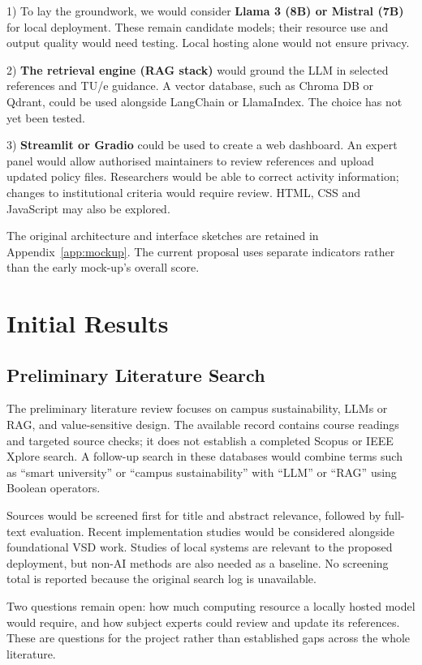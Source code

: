 \documentclass[11pt,a4paper]{article}
\begin{document}
1) To lay the groundwork, we would consider \textbf{Llama 3 (8B) or Mistral (7B)} for local deployment. These remain candidate models; their resource use and output quality would need testing. Local hosting alone would not ensure privacy.

2) \textbf{The retrieval engine (RAG stack)} would ground the LLM in selected references and TU/e guidance. A vector database, such as Chroma DB or Qdrant, could be used alongside LangChain or LlamaIndex. The choice has not yet been tested.

3) \textbf{Streamlit or Gradio} could be used to create a web dashboard. An expert panel would allow authorised maintainers to review references and upload updated policy files. Researchers would be able to correct activity information; changes to institutional criteria would require review. HTML, CSS and JavaScript may also be explored.

The original architecture and interface sketches are retained in Appendix~\ref{app:mockup}. The current proposal uses separate indicators rather than the early mock-up's overall score.

\clearpage
\section{Initial Results}

\subsection{Preliminary Literature Search}

The preliminary literature review focuses on campus sustainability, LLMs or RAG, and value-sensitive design. The available record contains course readings and targeted source checks; it does not establish a completed Scopus or IEEE Xplore search. A follow-up search in these databases would combine terms such as ``smart university'' or ``campus sustainability'' with ``LLM'' or ``RAG'' using Boolean operators.

Sources would be screened first for title and abstract relevance, followed by full-text evaluation. Recent implementation studies would be considered alongside foundational VSD work. Studies of local systems are relevant to the proposed deployment, but non-AI methods are also needed as a baseline. No screening total is reported because the original search log is unavailable.

Two questions remain open: how much computing resource a locally hosted model would require, and how subject experts could review and update its references. These are questions for the project rather than established gaps across the whole literature.
\end{document}
